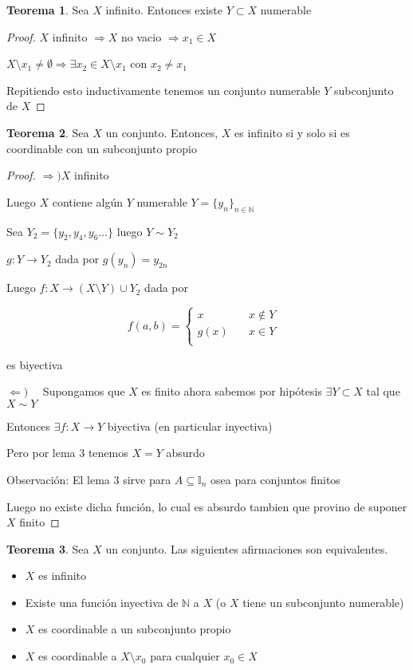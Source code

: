 \documentclass[12pt]{article}
\newcommand{\I}{\mathbb{I}}
\newcommand{\N}{\mathbb{N}}
\newcommand{\Ra}{\Rightarrow}
\newcommand{\ra}{\rightarrow}
\theoremstyle{definition}
\newtheorem{theorem}{Teorema}
\begin{document}
\begin{theorem}
  Sea $X$ infinito. Entonces existe $Y \subset X$ numerable

  \begin{proof}
    $X$ infinito $\Ra X$ no vacio $\Ra x_{1} \in X$

    $X \setminus {x_{1}} \neq \emptyset \Ra \exists x_{2} \in X \setminus {x_{1}}$ con $x_{2} \neq x_{1}$
  
Repitiendo esto inductivamente tenemos un conjunto numerable $Y$ subconjunto de $X$

  \end{proof}

\end{theorem}
\begin{theorem}
  Sea $X$ un conjunto. Entonces, $X$ es infinito si y solo si es coordinable con un subconjunto propio
  \begin{proof}
$\Ra ) X$ infinito

Luego $X$ contiene algún $Y$ numerable $Y=\{y_{n}\}_{n \in \N}$

Sea $Y_{2} = \{y_{2},y_{4},y_{6} \dots \}$ luego $Y \sim Y_{2}$

$g: Y \ra Y_{2}$ dada por $g(y_{n}) = y_{2n}$

Luego $f: X \ra (X \setminus Y) \cup Y_{2}$ dada por  

\[
f(a,b) =
     \begin{cases}
       \text{$x$} &\quad\text{$x \notin Y$ }\\
       \text{$g(x)$} &\quad\text{$x \in Y$} \\
     \end{cases}
\]

es biyectiva

$\Leftarrow ) \quad$ Supongamos que $X$ es finito ahora sabemos por hipótesis $\exists Y \subset X$ tal que $X \sim Y$ 

Entonces $\exists f:X \ra Y$ biyectiva (en particular inyectiva) 

Pero por lema 3 tenemos $X = Y$ absurdo 

Observación: El lema 3 sirve para $A \subseteq \I_{n}$ osea para conjuntos finitos

Luego no existe dicha función, lo cual es absurdo tambien que provino de suponer $X$ finito
\end{proof}
\end{theorem}

\begin{theorem}
  Sea $X$ un conjunto. Las siguientes afirmaciones son equivalentes.
  \begin{itemize}
    \item $X$ es infinito
    \item Existe una función inyectiva de $\N$ a $X$ (o $X$ tiene un subconjunto numerable)
    \item $X$ es coordinable a un subconjunto propio
    \item $X$ es coordinable a $X \setminus {x_{0}}$ para cualquier $x_{0} \in X$
  \end{itemize}
\end{theorem}
\end{document}
